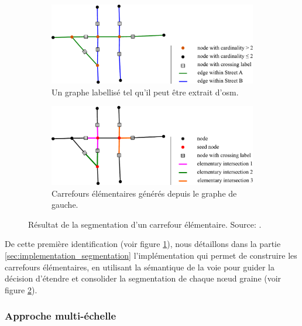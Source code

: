 \begin{figure}
    \centering
    \begin{subfigure}[t]{.49\linewidth}
        \includegraphics[width=\textwidth]{images/modelisation/segmentation/segmentation-step1.pdf}
        \caption{Un graphe labellisé tel qu'il peut être extrait d'\gls{osm}.\label{fig:modelisation_segmentation_step1}}
    \end{subfigure}
    \begin{subfigure}[t]{.49\linewidth}
        \includegraphics[width=\textwidth]{images/modelisation/segmentation/segmentation-step2.pdf}
        \caption{Carrefours élémentaires générés depuis le graphe de gauche. \label{fig:modelisation_segmentation_step2}}
    \end{subfigure}
    \caption{Résultat de la segmentation d'un carrefour élémentaire. Source: \cite{Favreau2022}.}
    \label{fig:modelisation_segmentation_step1&2}
\end{figure}

\newpar{}

De cette première identification (voir figure \ref{fig:modelisation_segmentation_step1}), nous détaillons dans la partie \ref{sec:implementation_segmentation} l'implémentation qui permet de construire les carrefours élémentaires, en utilisant la sémantique de la voie pour guider la décision d'étendre et consolider la segmentation de chaque nœud graine (voir figure \ref{fig:modelisation_segmentation_step2}).

\subsubsection{Approche multi-échelle}

